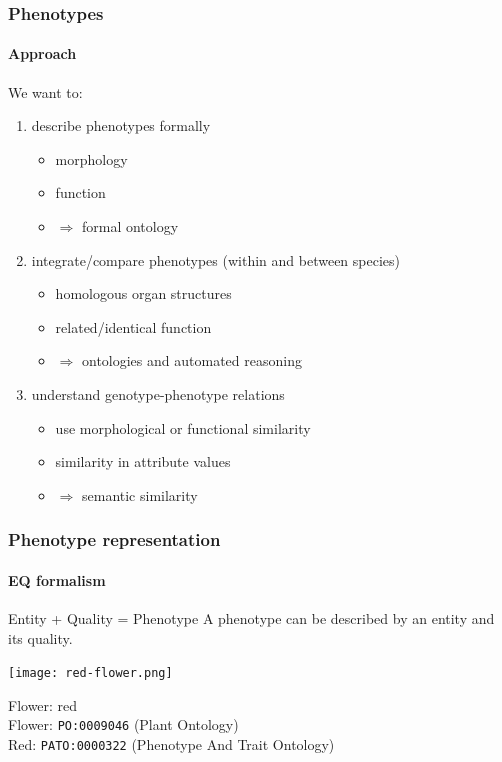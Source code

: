 \documentclass{beamer}
\begin{document}
\begin{frame}
\frametitle{Phenotypes}
\framesubtitle{Approach}
We want to:
\begin{enumerate}
\item describe phenotypes formally
  \begin{itemize}
  \item morphology
  \item function
  \item $\Rightarrow$ formal ontology
  \end{itemize}
  \pause
\item integrate/compare phenotypes (within and between species)
  \begin{itemize}
  \item homologous organ structures
  \item related/identical function
  \item $\Rightarrow$ ontologies and automated reasoning
  \end{itemize}
  \pause
\item understand genotype-phenotype relations
  \begin{itemize}
  \item use morphological or functional similarity
  \item similarity in attribute values
  \item $\Rightarrow$ semantic similarity
  \end{itemize}
\end{enumerate}
\end{frame}

\begin{frame}
\frametitle{Phenotype representation}
\framesubtitle{EQ formalism}
\begin{block}{Entity + Quality = Phenotype}
A phenotype can be described by an entity and its quality.
\end{block}
\pause

\centerline{\texttt{[image: red-flower.png]}}

Flower: red\\
\pause
Flower: {\tt PO:0009046} (Plant Ontology)\\
\pause
Red: {\tt PATO:0000322} (Phenotype And Trait Ontology)
\end{frame}
\end{document}
